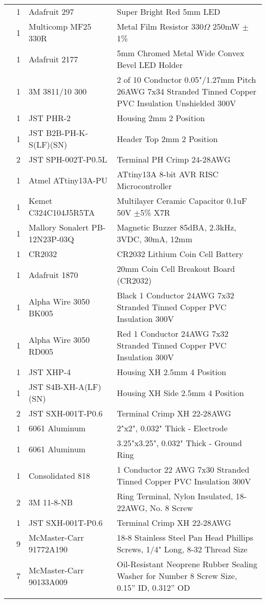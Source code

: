 \begin{longtabu}{X[3,c,m] X[1,c,m] X[3,c,m] X[5,l,m]}
   & 1 & Adafruit 297 & Super Bright Red 5mm LED \\
  & 1 & Multicomp MF25 330R & Metal Film Resistor 330$\Omega$ 250mW $\pm$1\% \\
  & 1 & Adafruit 2177 & 5mm Chromed Metal Wide Convex Bevel LED Holder \\
  & 1 & 3M 3811/10 300 & 2 of 10 Conductor 0.05"/1.27mm Pitch 26AWG 7x34 Stranded Tinned Copper PVC Insulation Unshielded 300V \\
  & 1 & JST PHR-2 & Housing 2mm 2 Position \\
  & 1 & JST B2B-PH-K-S(LF)(SN) & Header Top 2mm 2 Position \\
  & 2 & JST SPH-002T-P0.5L & Terminal PH Crimp 24-28AWG \\
  & 1 & Atmel ATtiny13A-PU & ATtiny13A 8-bit AVR RISC Microcontroller \\
  & 1 & Kemet C324C104J5R5TA & Multilayer Ceramic Capacitor 0.1uF 50V $\pm$5\% X7R \\ \mrule

   & 1 & Mallory Sonalert PB-12N23P-03Q & Magnetic Buzzer 85dBA, 2.3kHz, 3VDC, 30mA, 12mm \\ \mrule

   & 1 & CR2032 & CR2032 Lithium Coin Cell Battery \\
  & 1 & Adafruit 1870 & 20mm Coin Cell Breakout Board (CR2032) \\
  & 1 & Alpha Wire 3050 BK005 & Black 1 Conductor 24AWG 7x32 Stranded Tinned Copper PVC Insulation 300V \\
  & 1 & Alpha Wire 3050 RD005 & Red 1 Conductor 24AWG 7x32 Stranded Tinned Copper PVC Insulation 300V \\
  & 1 & JST XHP-4 & Housing XH 2.5mm 4 Position \\
  & 1 & JST S4B-XH-A(LF)(SN) & Housing XH Side 2.5mm 4 Position \\
  & 2 & JST SXH-001T-P0.6 & Terminal Crimp XH 22-28AWG \\ \mrule

   & 1 & 6061 Aluminum & 2"x2", 0.032" Thick - Electrode \\
  & 1 & 6061 Aluminum & 3.25"x3.25", 0.032" Thick - Ground Ring \\
  & 1 & Consolidated 818 & 1 Conductor 22 AWG 7x30 Stranded Tinned Copper PVC Insulation 300V \\
  & 2 & 3M 11-8-NB & Ring Terminal, Nylon Insulated, 18-22AWG, No. 8 Screw \\
  & 1 & JST SXH-001T-P0.6 & Terminal Crimp XH 22-28AWG \\
  & 9 & McMaster-Carr 91772A190 & 18-8 Stainless Steel Pan Head Phillips Screws, 1/4" Long, 8-32 Thread Size \\
  & 7 & McMaster-Carr 90133A009 & Oil-Resistant Neoprene Rubber Sealing Washer for Number 8 Screw Size, 0.15” ID, 0.312” OD \\ \mrule


\end{longtabu}
